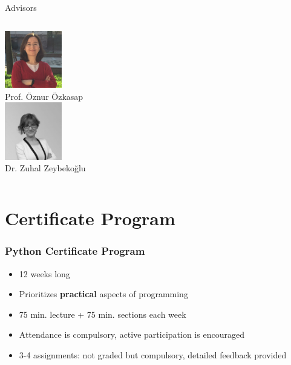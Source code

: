 \begin{frame}{Advisors}
\begin{columns}
        \column{3.333cm}
          \centering
          \includegraphics[width=2.5cm]{images/oozkasap.jpg}\\
          Prof. Öznur Özkasap\\
          \vspace{2.5mm}
          \includegraphics[width=2.5cm]{images/zzeybekoglu.jpg}\\
          Dr. Zuhal Zeybekoğlu\\
			\end{columns}
    
    \end{frame}

    \section{Certificate Program}
      \begin{frame}
        \frametitle{Python Certificate Program}
        \LARGE
        \pause
        \begin{itemize}
          \item 12 weeks long
          \pause
          \item Prioritizes \textbf{practical} aspects of programming
          \pause
          \item 75 min. lecture + 75 min. sections each week
          \pause
          \item Attendance is compulsory, active participation is encouraged 
          \pause
          \item 3-4 assignments: not graded but compulsory, detailed feedback provided
        \end{itemize}

      \end{frame}

